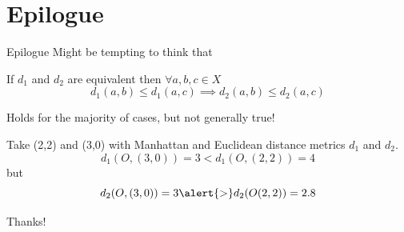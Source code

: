 \documentclass{beamer}
\begin{document}
\section{Epilogue}
\begin{frame}{Epilogue}
    Might be tempting to think that
    \begin{block}{}
        If $d_1$ and $d_2$ are equivalent then $\forall a,b,c \in X$
        \[{}
            d_1(a,b) \le d_1(a,c) \implies d_2(a,b) \le d_2(a,c)
        \]{}
    \end{block}

    \pause{}

    \begin{alertblock}{}
        Holds for the majority of cases, but not generally true!
    \end{alertblock}
    \pause{}
    Take (2,2) and (3,0) with Manhattan and Euclidean distance metrics $d_1$ and $d_2$.\\
    \[
        d_1(O,(3,0)) = 3 < d_1(O,(2,2)) = 4
    \]
    \pause{}
    but
    \[
        d_2(O,(3,0)) = 3 \alert{>} d_2(O(2,2)) = 2.8
    \]

\end{frame}

\begin{frame}{}
    \centering
    \Huge{Thanks!}
\end{frame}
\end{document}
